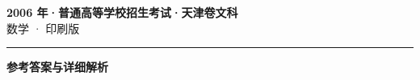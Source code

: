 \documentclass[zihao=5, a4paper]{ctexart}
\begin{document}
\begin{center}
  {\Large\bfseries 2006 年·普通高等学校招生考试·天津卷文科}\\[4pt]
  {\large 数学 · 印刷版}
\end{center}
\medskip
{}

\par\bigskip\hrule\bigskip
{}
\begin{center}{\large\bfseries 参考答案与详细解析}\end{center}
\smallskip

\end{document}
